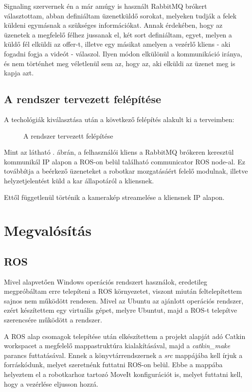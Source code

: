 \documentclass[11pt,a4paper,oneside]{article}
\newcommand{\afigref}[1]{\aref{fig:#1}.}
\newcommand{\insertfig}[4]{
	\vspace*{2mm}
	\begin{figure}[#4]
		\center
		\resizebox{#3}{!}{\texttt{[image: images/\#1]}}
		\parbox{0.8\textwidth}{\vspace*{4mm}\caption{{#2}}\small\label{fig:#1}}
	\end{figure}
	\vspace*{-2\parskip}
}
\begin{document}
Signaling szervernek én a már amúgy is használt RabbitMQ brókert választottam, abban definiáltam üzenetküldő sorokat, melyeken tudják a felek küldeni egymásnak a szükséges információkat. Annak érdekében, hogy az üzenetek a megfelelő félhez jussanak el, két sort definiáltam, egyet, melyen a küldő fél elküldi az offer-t, illetve egy másikat amelyen a vezérlő kliens - aki fogadni fogja a videót - válaszol. Ilyen módon elkülönül a kommunikáció iránya, és nem történhet meg véletlenül sem az, hogy az, aki elküldi az üzenet meg is kapja azt.


\subsection{A rendszer tervezett felépítése}

A techológiák kiválasztása után a következő felépítés alakult ki a terveimben:

\insertfig{felepites}{A rendszer tervezett felépítése}{12cm}{h!}

Mint az látható \afigref{felepites} ábrán, a felhasználói kliens a RabbitMQ brókeren keresztül kommunikál IP alapon a ROS-on belül található communicator ROS node-al. Ez továbbítja a beérkező üzeneteket a robotkar mozgatásáért felelő modulnak, illetve helyzetjelentést küld a kar állapotáról a kliensnek.

Ettől függetlenül történik a kamerakép streamelése a kliensnek IP alapon.

\newpage
\section{Megvalósítás}

\subsection{ROS}

Mivel alapvetően Windows operációs rendszert használok, eredetileg megpróbáltam erre telepíteni a ROS környezetet, viszont miután feltelepítettem sajnos nem működött rendesen. Mivel az Ubuntu az ajánlott operációs rendszer, ezért készítettem egy virtuális gépet, melyre Ubuntut, majd a ROS-t telepítve szerencsére működött a rendszer.

A ROS alap csomagok telepítése után elkészítettem a projekt alapját adó Catkin workspacet a megfelelő mappastruktúra kialakításával, majd a \textit{catkin\_make} parancs futtatásával. Ennek a könyvtárrendszernek a \textit{src} mappájába kell írjuk a forráskódunk, melyet szeretnénk futtatni ROS-on belül. Ebbe a mappába helyeztem el a robotkarhoz tartozó MoveIt konfigurációt is, melyet futtatni kell, hogy a vezérlése eljusson hozzá.
\end{document}

